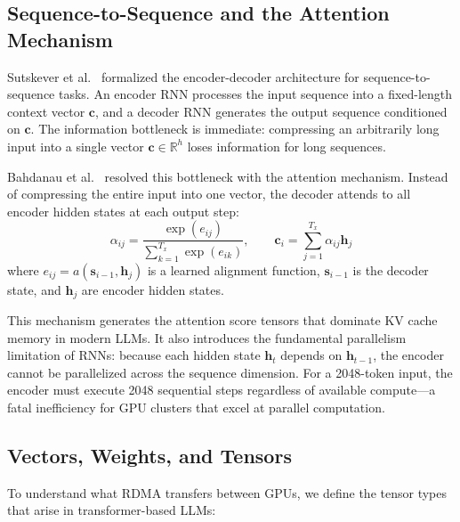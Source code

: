 \documentclass[11pt,letterpaper]{article}
\theoremstyle{definition}
\begin{document}
\subsection{Sequence-to-Sequence and the Attention Mechanism}

Sutskever et al.~\cite{sutskever2014sequence} formalized the encoder-decoder architecture for sequence-to-sequence tasks. An encoder RNN processes the input sequence into a fixed-length context vector $\mathbf{c}$, and a decoder RNN generates the output sequence conditioned on $\mathbf{c}$. The information bottleneck is immediate: compressing an arbitrarily long input into a single vector $\mathbf{c} \in \mathbb{R}^h$ loses information for long sequences.

Bahdanau et al.~\cite{bahdanau2014attention} resolved this bottleneck with the attention mechanism. Instead of compressing the entire input into one vector, the decoder attends to all encoder hidden states at each output step:
\begin{equation}
    \alpha_{ij} = \frac{\exp(e_{ij})}{\sum_{k=1}^{T_x} \exp(e_{ik})}, \qquad \mathbf{c}_i = \sum_{j=1}^{T_x} \alpha_{ij} \mathbf{h}_j
\end{equation}
where $e_{ij} = a(\mathbf{s}_{i-1}, \mathbf{h}_j)$ is a learned alignment function, $\mathbf{s}_{i-1}$ is the decoder state, and $\mathbf{h}_j$ are encoder hidden states.

This mechanism generates the attention score tensors that dominate KV cache memory in modern LLMs. It also introduces the fundamental parallelism limitation of RNNs: because each hidden state $\mathbf{h}_t$ depends on $\mathbf{h}_{t-1}$, the encoder cannot be parallelized across the sequence dimension. For a 2048-token input, the encoder must execute 2048 sequential steps regardless of available compute---a fatal inefficiency for GPU clusters that excel at parallel computation.

\subsection{Vectors, Weights, and Tensors}

To understand what RDMA transfers between GPUs, we define the tensor types that arise in transformer-based LLMs:
\end{document}
